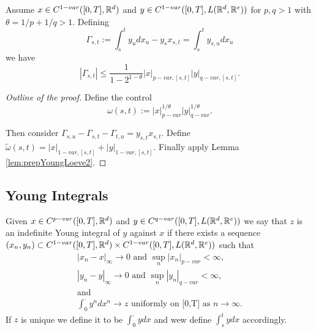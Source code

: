 \begin{proposition}
    Assume \( x \in C^{1-var}([0,T], \mathbb{R}^d) \) and \( y \in C^{1-var}([0,T], L(\mathbb{R}^d,\mathbb{R}^e)) \)
    for \( p, q > 1 \) with \( \theta = 1/p + 1/q > 1 \). Defining
    \begin{equation}
        \Gamma_{s,t} := \int_s^t y_u dx_u - y_s x_{s,t} = \int_s^t y_{s,u} dx_u
    \end{equation}
    we have 
    \begin{equation}
        |\Gamma_{s,t}| \le \frac{1}{1 - 2^{1 - \theta}} |x|_{p-var,[s,t]} |y|_{q-var,[s,t]}.
    \end{equation}
\end{proposition}
\begin{proof}[Outline of the proof]
    Define the control
    \[
        \omega(s,t) := |x|^{1/\theta}_{p-var} |y|^{1/\theta}_{q-var}.
    \]

    Then consider \( \Gamma_{s,u} - \Gamma_{s,t} - \Gamma_{t,u} = y_{s,t} x_{s,t} \).
    Define \( \tilde{\omega}(s,t) = |x|_{1-var,[s,t]} + |y|_{1-var,[s,t]}. \)
    Finally apply Lemma \ref{lem:prepYoungLoeve2}.
\end{proof}

\subsection{Young Integrals}

\begin{definition}
    Given \( x \in C^{p-var}([0,T], \mathbb{R}^d) \) and \( y \in C^{q-var}([0,T], L(\mathbb{R}^d,\mathbb{R}^e)) \)
    we say that \( z \) is an indefinite Young integral of \( y \) against \( x \) if there exists a sequence \((x_n, y_n) \subset C^{1-var}([0,T],\mathbb{R}^d) \times C^{1-var}([0,T],L(\mathbb{R}^d,\mathbb{R}^e))\) such that
    \begin{align}
        |x_n - x|_\infty \rightarrow 0 \text{ and } \sup_n |x_n|_{p-var} < \infty, \\
        |y_n - y|_\infty \rightarrow 0 \text{ and } \sup_n |y_n|_{q-var} < \infty, \\
        \text{and} \\   
        \int_0^\cdot y^n dx^n \rightarrow z \text{ uniformly on [0,T] as } n \rightarrow \infty.
    \end{align}
    If \( z \) is unique we define it to be \( \int_0^\cdot y dx\) and wew define \( \int_s^t y dx \) accordingly.
 \end{definition}
 
